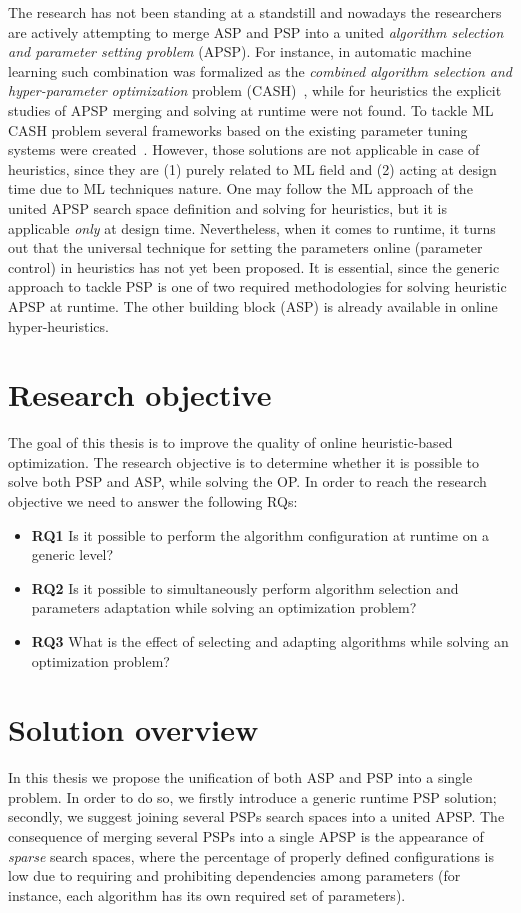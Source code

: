 The research has not been standing at a standstill and nowadays the researchers are actively attempting to merge ASP and PSP into a united \emph{algorithm selection and parameter setting problem} (APSP). For instance, in automatic machine learning such combination was formalized as the \emph{combined algorithm selection and hyper-parameter optimization} problem (CASH)~\cite{thornton2013auto}, while for heuristics the explicit studies of APSP merging and solving at runtime were not found. To tackle ML CASH problem several frameworks based on the existing parameter tuning systems were created~\cite{thornton2013auto,feurer2015efficient,olson2019tpot}. However, those solutions are not applicable in case of heuristics, since they are (1) purely related to ML field and (2) acting at design time due to ML techniques nature. One may follow the ML approach of the united APSP search space definition and solving for heuristics, but it is applicable \emph{only} at design time. Nevertheless, when it comes to runtime, it turns out that the universal technique for setting the parameters online (parameter control) in heuristics has not yet been proposed. It is essential, since the generic approach to tackle PSP is one of two required methodologies for solving heuristic APSP at runtime. The other building block (ASP) is already available in online hyper-heuristics.

\section{Research objective}\label{intro: research objective}
The goal of this thesis is to improve the quality of online heuristic-based optimization. The research objective is to determine whether it is possible to solve both PSP and ASP, while solving the OP. In order to reach the research objective we need to answer the following RQs:
\begin{itemize}%
	\item \textbf{RQ1} Is it possible to perform the algorithm configuration at runtime on a generic level?
	\item \textbf{RQ2} Is it possible to simultaneously perform algorithm selection and parameters adaptation while solving an optimization problem?
	\item \textbf{RQ3} What is the effect of selecting and adapting algorithms while solving an optimization problem?
\end{itemize}

\section{Solution overview}
In this thesis we propose the unification of both ASP and PSP into a single problem. In order to do so, we firstly introduce a generic runtime PSP solution; secondly, we suggest joining several PSPs search spaces into a united APSP. The consequence of merging several PSPs into a single APSP is the appearance of \emph{sparse} search spaces, where the percentage of properly defined configurations is low due to requiring and prohibiting dependencies among parameters (for instance, each algorithm has its own required set of parameters).

